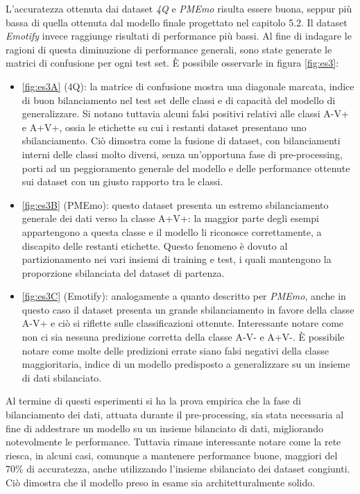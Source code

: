 \documentclass[11pt]{report}
\begin{document}
\vspace{1cm}

L'accuratezza ottenuta dai dataset \textit{4Q} e \textit{PMEmo} risulta essere buona, seppur più bassa di quella ottenuta dal modello finale progettato nel capitolo 5.2.  Il dataset \textit{Emotify} invece raggiunge risultati di performance più bassi. Al fine di indagare le ragioni di questa diminuzione di performance generali, sono state generate le matrici di confusione per ogni test set. È possibile osservarle in figura \ref{fig:es3}:
\begin{itemize}
    \item \ref{fig:es3A} (4Q): la matrice di confusione mostra una diagonale marcata, indice di buon bilanciamento nel test set delle classi e di capacità del modello di generalizzare. Si notano tuttavia alcuni falsi positivi relativi alle classi A-V+ e A+V+, ossia le etichette su cui i restanti dataset presentano uno sbilanciamento. Ciò dimostra come la fusione di dataset, con bilanciamenti interni delle classi molto diversi, senza un'opportuna fase di pre-processing, porti ad un peggioramento generale del modello e delle performance ottenute sui dataset con un giusto rapporto tra le classi.
    
    \item \ref{fig:es3B} (PMEmo): questo dataset presenta un estremo sbilanciamento generale dei dati verso la classe A+V+: la maggior parte degli esempi appartengono a questa classe e il modello li riconosce correttamente, a discapito delle restanti etichette. Questo fenomeno è dovuto al partizionamento nei vari insiemi di training e test, i quali mantengono la proporzione sbilanciata del dataset di partenza.
    
    \item \ref{fig:es3C} (Emotify): analogamente a quanto descritto per \textit{PMEmo}, anche in questo caso il dataset presenta un grande sbilanciamento in favore della classe A-V+ e ciò si riflette sulle classificazioni ottenute. Interessante notare come non ci sia nessuna predizione corretta della classe A-V- e A+V-. È possibile notare come molte delle predizioni errate siano falsi negativi della classe maggioritaria, indice di un modello predisposto a generalizzare su un insieme di dati sbilanciato.
\end{itemize}

Al termine di questi esperimenti si ha la prova empirica che la fase di bilanciamento dei dati, attuata durante il pre-processing, sia stata necessaria al fine di addestrare un modello su un insieme bilanciato di dati, migliorando notevolmente le performance. Tuttavia rimane interessante notare come la rete riesca, in alcuni casi, comunque a mantenere performance buone, maggiori del 70\% di accuratezza, anche utilizzando l'insieme sbilanciato dei dataset congiunti. Ciò dimostra che il modello preso in esame sia architetturalmente solido.
\end{document}
